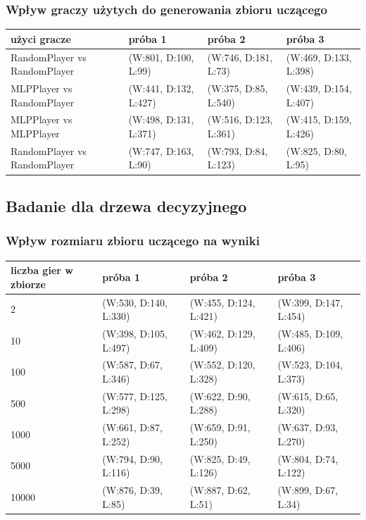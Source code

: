 \documentclass{article}
\begin{document}
\subsubsection{Wpływ graczy użytych do generowania zbioru uczącego}

\begin{center}
  \begin{tabular}{ | l | l | l | l | }
    \hline
    użyci gracze & próba 1 & próba 2 & próba 3 \\ \hline
    RandomPlayer vs RandomPlayer & (W:801, D:100, L:99) & (W:746, D:181, L:73) & (W:469, D:133, L:398) \\ \hline
    MLPPlayer vs RandomPlayer & (W:441, D:132, L:427) & (W:375, D:85, L:540) & (W:439, D:154, L:407) \\ \hline
    MLPPlayer vs MLPPlayer & (W:498, D:131, L:371) & (W:516, D:123, L:361) & (W:415, D:159, L:426) \\ \hline
    RandomPlayer vs RandomPlayer & (W:747, D:163, L:90) & (W:793, D:84, L:123) & (W:825, D:80, L:95) \\ \hline
  \end{tabular}
\end{center}

\subsection{Badanie dla drzewa decyzyjnego}

\subsubsection{Wpływ rozmiaru zbioru uczącego na wyniki}

\begin{center}
  \begin{tabular}{ | l | l | l | l | }
    \hline
    liczba gier w zbiorze & próba 1 & próba 2 & próba 3 \\ \hline
    2 & (W:530, D:140, L:330) & (W:455, D:124, L:421) & (W:399, D:147, L:454) \\ \hline
    10 & (W:398, D:105, L:497) & (W:462, D:129, L:409) & (W:485, D:109, L:406) \\ \hline
    100 & (W:587, D:67, L:346) & (W:552, D:120, L:328) & (W:523, D:104, L:373) \\ \hline
    500 & (W:577, D:125, L:298) & (W:622, D:90, L:288) & (W:615, D:65, L:320) \\ \hline
    1000 & (W:661, D:87, L:252) & (W:659, D:91, L:250) & (W:637, D:93, L:270) \\ \hline
    5000 & (W:794, D:90, L:116) & (W:825, D:49, L:126) & (W:804, D:74, L:122) \\ \hline
    10000 & (W:876, D:39, L:85) & (W:887, D:62, L:51) & (W:899, D:67, L:34) \\ \hline
  \end{tabular}
\end{center}
\end{document}
